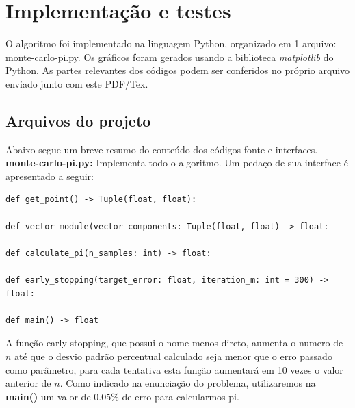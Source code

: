\documentclass[twocolumn,amsmath,amssymb,floatfix]{revtex4}
\begin{document}
\section{Implementação e testes}

O algoritmo foi implementado na linguagem Python, organizado em 1 arquivo: monte-carlo-pi.py. Os gráficos foram
gerados usando a biblioteca \textit{matplotlib} do Python. As partes relevantes dos códigos podem ser
conferidos no próprio arquivo enviado junto com este PDF/Tex.

\subsection{Arquivos do projeto}
Abaixo segue um breve resumo do conteúdo dos códigos fonte e interfaces.
\\\indent \textbf{monte-carlo-pi.py:} Implementa todo o algoritmo. Um pedaço de sua interface é apresentado a seguir:
\begin{lstlisting}
def get_point() -> Tuple(float, float):

def vector_module(vector_components: Tuple(float, float) -> float:

def calculate_pi(n_samples: int) -> float:

def early_stopping(target_error: float, iteration_m: int = 300) -> float:

def main() -> float
\end{lstlisting}
A função early stopping, que possui o nome menos direto, aumenta o numero de $n$ até que o desvio padrão percentual calculado seja menor que o erro passado como parâmetro, para cada tentativa esta função aumentará em 10 vezes o valor anterior de $n$. Como indicado na enunciação do problema, utilizaremos na \textbf{main()} um valor de $0.05\%$ de erro para calcularmos pi. 
\end{document}
